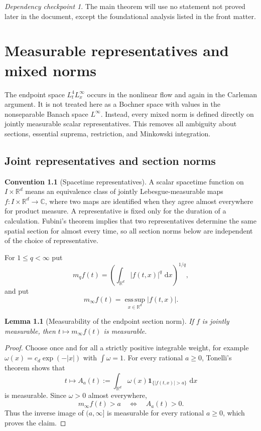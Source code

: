 \documentclass[11pt,oneside]{book}
\newtheorem{lemma}[theorem]{Lemma}
\theoremstyle{definition}
\newtheorem{convention}[theorem]{Convention}
\theoremstyle{remark}
\newtheorem{checkpoint}[theorem]{Dependency checkpoint}
\newcommand{\R}{\mathbb R}
\newcommand{\C}{\mathbb C}
\newcommand{\1}{\mathbf 1}
\newcommand{\esssup}{\operatorname*{ess\,sup}}
\newcommand{\dd}{\,\mathrm d}
\begin{document}
\begin{checkpoint}
The main theorem will use no statement not proved later in the document,
except the foundational analysis listed in the front matter.
\end{checkpoint}

\chapter{Measurable representatives and mixed norms}\label{chap:mixed-norms}

The endpoint space $L^4_tL^\infty_x$ occurs in the nonlinear flow and again
in the Carleman argument.  It is not treated here as a Bochner space with
values in the nonseparable Banach space $L^\infty$.  Instead, every mixed norm
is defined directly on jointly measurable scalar representatives.  This
removes all ambiguity about sections, essential suprema, restriction, and
Minkowski integration.

\section{Joint representatives and section norms}

\begin{convention}[Spacetime representatives]\label{conv:joint-representatives}
A scalar spacetime function on $I\times\R^d$ means an equivalence class of
jointly Lebesgue-measurable maps $f:I\times\R^d\to\C$, where two maps are
identified when they agree almost everywhere for product measure.  A
representative is fixed only for the duration of a calculation.  Fubini's
theorem implies that two representatives determine the same spatial section
for almost every time, so all section norms below are independent of the
choice of representative.
\end{convention}

For $1\le q<\infty$ put
\[
 m_qf(t)=\left(\int_{\R^d}|f(t,x)|^q\,\dd x\right)^{1/q},
\]
and put
\[
 m_\infty f(t)=\esssup_{x\in\R^d}|f(t,x)|.
\]

\begin{lemma}[Measurability of the endpoint section norm]
\label{lem:measurable-esssup-section}
If $f$ is jointly measurable, then $t\mapsto m_\infty f(t)$ is measurable.
\end{lemma}

\begin{proof}
Choose once and for all a strictly positive integrable weight, for example
$\omega(x)=c_d\exp(-|x|)$ with $\int\omega=1$.  For every rational $a\ge0$,
Tonelli's theorem shows that
\[
 t\longmapsto A_a(t)
 :=\int_{\R^d}\omega(x)\1_{\{|f(t,x)|>a\}}\,\dd x
\]
is measurable.  Since $\omega>0$ almost everywhere,
\[
 m_\infty f(t)>a \quad\Longleftrightarrow\quad A_a(t)>0.
\]
Thus the inverse image of $(a,\infty]$ is measurable for every rational
$a\ge0$, which proves the claim.
\end{proof}
\end{document}
